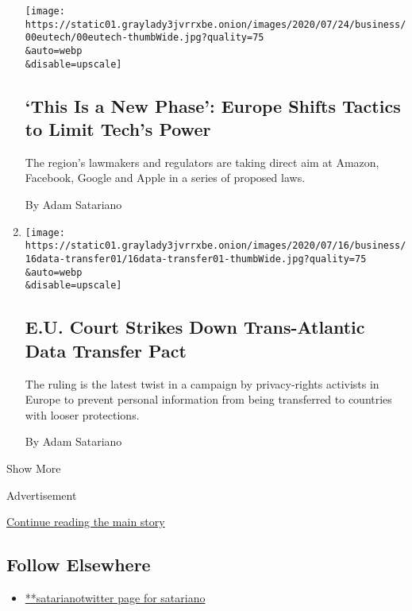 \begin{enumerate}
  \texttt{[image: https://static01.graylady3jvrrxbe.onion/images/2020/07/24/business/00eutech/00eutech-thumbWide.jpg?quality=75\\\&auto=webp\\\&disable=upscale]}

  \hypertarget{this-is-a-new-phase-europe-shifts-tactics-to-limit-techs-power}{%
  \subsection{`This Is a New Phase': Europe Shifts Tactics to Limit
  Tech's
  Power}\label{this-is-a-new-phase-europe-shifts-tactics-to-limit-techs-power}}

  The region's lawmakers and regulators are taking direct aim at Amazon,
  Facebook, Google and Apple in a series of proposed laws.

  By Adam Satariano
\item
  \href{/2020/07/16/business/eu-data-transfer-pact-rejected.html}{}

  \texttt{[image: https://static01.graylady3jvrrxbe.onion/images/2020/07/16/business/16data-transfer01/16data-transfer01-thumbWide.jpg?quality=75\\\&auto=webp\\\&disable=upscale]}

  \hypertarget{eu-court-strikes-down-trans-atlantic-data-transfer-pact}{%
  \subsection{E.U. Court Strikes Down Trans-Atlantic Data Transfer
  Pact}\label{eu-court-strikes-down-trans-atlantic-data-transfer-pact}}

  The ruling is the latest twist in a campaign by privacy-rights
  activists in Europe to prevent personal information from being
  transferred to countries with looser protections.

  By Adam Satariano
\end{enumerate}

Show More

Advertisement

\protect\hyperlink{after-mid2}{Continue reading the main story}

\hypertarget{follow-elsewhere}{%
\subsection{Follow Elsewhere}\label{follow-elsewhere}}

\begin{itemize}
\tightlist
\item
  \href{https://twitter.com/satariano}{**satarianotwitter page for
  satariano}
\end{itemize}

